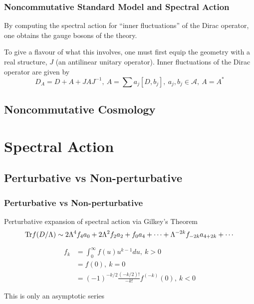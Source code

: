 \documentclass{beamer}
\def\cA{{\mathcal A}}
\def\Tr{{\rm Tr}}
\begin{document}
\begin{frame}
	\frametitle{Noncommutative Standard Model and Spectral Action}
	\begin{block}{}
		By computing the spectral action for ``inner fluctuations'' of the Dirac operator, one obtains the gauge bosons of the theory.
	\end{block}

	\begin{block}{}
		To give a flavour of what this involves, one must first equip the geometry with a real structure, $J$ (an antilinear unitary operator). Inner fluctuations of the Dirac operator are given by
		\[
		D_A = D + A + J A J^{-1},~ A = \sum a_j [D, b_j],~ a_j, b_j \in \cA,~ A = A^*
		\]
	\end{block}
\end{frame}

\subsection{Noncommutative Cosmology}

\section{Spectral Action}

\subsection{Perturbative vs Non-perturbative}

\begin{frame}
	\frametitle{Perturbative vs Non-perturbative}
	\begin{block}{Perturbative expansion of spectral action via Gilkey's Theorem}
		\[
			\Tr f (D/\Lambda) \sim 2 \Lambda^4 f_4 a_0 + 2 \Lambda^2 f_2 a_2 + f_0 a_4 + \cdots + \Lambda^{-2k} f_{-2k} a_{4+2k} + \cdots
		\]

		\begin{align*}
			f_k &= \int_{0}^{\infty} f(u) u^{k-1} du, ~ k>0 \\
			&= f(0), ~ k = 0\\
			&= (-1)^{-k/2} \frac{(-k/2)!}{-k!}f^{(-k)}(0), ~ k < 0
		\end{align*}
	\end{block}

	\pause

	\begin{alertblock}{This is only an asymptotic series}

	\end{alertblock}
\end{frame}
\end{document}
